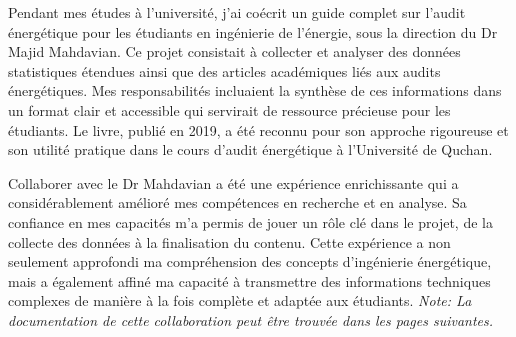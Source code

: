 \documentclass{article}
\begin{document}
    Pendant mes études à l'université, j'ai coécrit un guide complet sur l'audit énergétique pour les étudiants en ingénierie de l'énergie, sous la direction du Dr Majid Mahdavian. Ce projet consistait à collecter et analyser des données statistiques étendues ainsi que des articles académiques liés aux audits énergétiques. Mes responsabilités incluaient la synthèse de ces informations dans un format clair et accessible qui servirait de ressource précieuse pour les étudiants. Le livre, publié en 2019, a été reconnu pour son approche rigoureuse et son utilité pratique dans le cours d'audit énergétique à l'Université de Quchan.

    Collaborer avec le Dr Mahdavian a été une expérience enrichissante qui a considérablement amélioré mes compétences en recherche et en analyse. Sa confiance en mes capacités m'a permis de jouer un rôle clé dans le projet, de la collecte des données à la finalisation du contenu. Cette expérience a non seulement approfondi ma compréhension des concepts d'ingénierie énergétique, mais a également affiné ma capacité à transmettre des informations techniques complexes de manière à la fois complète et adaptée aux étudiants.
    \newline
    \newline
    \textit {Note: La documentation de cette collaboration peut être trouvée dans les pages suivantes.}
    \newline
    \newline

    \newpage
\end{document}
